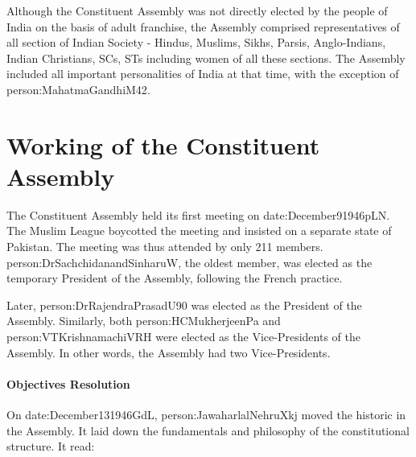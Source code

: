Although the Constituent Assembly was not directly elected by the people of India on the basis of adult franchise, the Assembly comprised representatives of all section of Indian Society - Hindus, Muslims, Sikhs, Parsis, Anglo-Indians, Indian Christians, SCs, STs including women of all these sections. The Assembly included all important personalities of India at that time, with the exception of \gls{person:MahatmaGandhiM42}.

\section{Working of the Constituent Assembly}

The Constituent Assembly held its first meeting on \gls{date:December91946pLN}. The Muslim League boycotted the meeting and insisted on a separate state of Pakistan. The meeting was thus attended by only 211 members. {\gls{person:DrSachchidanandSinharuW}, the oldest member, was elected as the temporary President of the Assembly, following the French practice.}

Later, \gls{person:DrRajendraPrasadU90} was elected as the President of the Assembly. Similarly, both \gls{person:HCMukherjeenPa} and \gls{person:VTKrishnamachiVRH} were elected as the Vice-Presidents of the Assembly. In other words, the Assembly had two Vice-Presidents.

\paragraph{Objectives Resolution}

On \gls{date:December131946GdL}, \gls{person:JawaharlalNehruXkj} moved the historic  in the Assembly. It laid down the fundamentals and philosophy of the constitutional structure. It read:

